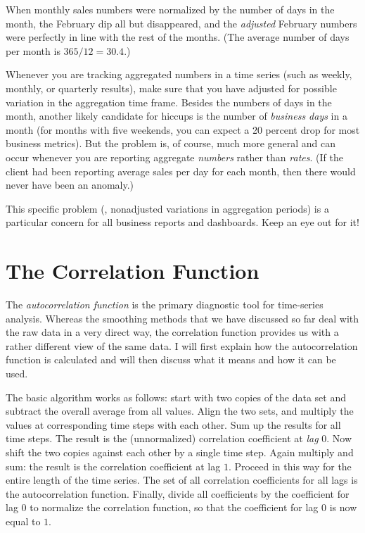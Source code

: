 When monthly sales numbers were normalized by the number of days in
the month, the February dip all but disappeared, and the \emph{adjusted}
February numbers were perfectly in line with the rest of the months.
(The average number of days per month is $365/12 = 30.4$.)

Whenever you are tracking aggregated numbers in a time series (such as
weekly, monthly, or quarterly results), make sure that you have
adjusted for possible variation in the aggregation time frame. Besides
the numbers\vadjust{\pagebreak} of days in the month, another likely candidate for hiccups
is the number of \emph{business days} in a month (for months with five
weekends, you can expect a 20 percent drop for most business metrics).  But
the problem is, of course, much more general and can occur whenever you
are reporting aggregate \emph{numbers} rather than \emph{rates}. (If
the client had been reporting average sales per day for each month,
then there would never have been an anomaly.)

This specific problem (\ie, nonadjusted variations in aggregation
periods) is a particular concern for all business reports and
dashboards. Keep an eye out for it!


\section{The Correlation Function}

 
The \emph{autocorrelation function}  is the primary diagnostic tool for
time-series analysis. Whereas the smoothing methods that we have
discussed so far deal with the raw data in a very direct way, the
correlation function provides us with a rather different view of the
same data. I will first explain how the autocorrelation function is
calculated and will then discuss what it means and how it can be used.

The basic algorithm works as follows: start with two copies of the
data set and subtract the overall average from all values.  Align the
two sets, and multiply the values at corresponding time steps with each
other. Sum up the results for all time steps. The result is the
(unnormalized) correlation coefficient at \emph{lag} $0$.  Now shift
the two copies against each other by a single time step.  Again
multiply and sum: the result is the correlation coefficient at lag
$1$. Proceed in this way for the entire length of the time series.
The set of all correlation coefficients for all lags is the
autocorrelation function. Finally, divide all coefficients by the
coefficient for lag $0$ to normalize the correlation function, so that
the coefficient for lag $0$ is now equal to $1$.

